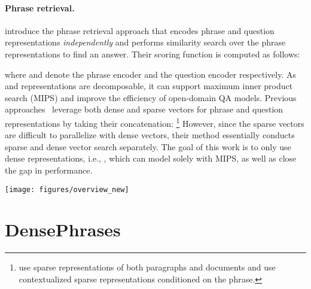 \documentclass[11pt,a4paper]{article}
\newcommand{\ours}{DensePhrases}
\begin{document}
\paragraph{Phrase retrieval.}
\citet{seo2019real} introduce the phrase retrieval approach that encodes phrase and question representations \textit{independently} and performs similarity search over the phrase representations to find an answer.
Their scoring function  is computed as follows:
\vspace{-0.5em}

where  and  denote the phrase encoder and the question encoder respectively.
As  and  representations are decomposable, it can support maximum inner product search (MIPS) and improve the efficiency of open-domain QA models.
Previous approaches~\cite{seo2019real,lee2020contextualized} leverage both dense and sparse vectors for phrase and question representations by taking their concatenation: \footnote{ use sparse representations of both paragraphs and documents  and  use contextualized sparse representations conditioned on the phrase.}
However, since the sparse vectors are difficult to parallelize with dense vectors, their method  essentially conducts sparse and dense vector search separately.
The goal of this work is to only use dense representations, i.e., , which can model  solely with MIPS, as well as close the gap in performance.



\begin{figure*}[t]
\begin{center}
\texttt{[image: figures/overview\_new]}
\end{center}
\caption{An overview of \ours.  (a) We learn dense phrase representations in a single passage (\S\ref{sec:single-passage}) along with in-batch and pre-batch negatives (\S\ref{sec:inbatch}, \S\ref{sec:prebatch}).
(b) With the top- retrieved phrase representations from the entire text corpus (\S\ref{sec:indexing_and_search}), we further perform query-side fine-tuning to optimize the question encoder (\S\ref{sec:qsft}).
During inference, our model simply returns the top-1 prediction.
}\label{fig:overview}
\end{figure*}


 
 


\section{{\ours}}
\end{document}
